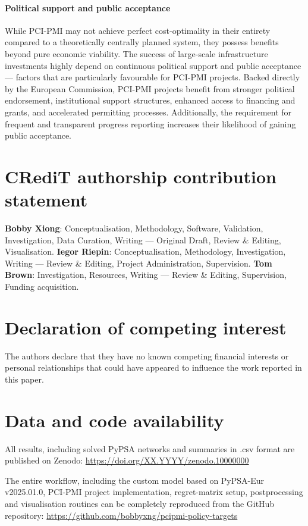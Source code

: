 \documentclass[final,5p,times,twocolumn,sort&compress]{elsarticle}
\begin{document}
\paragraph{Political support and public acceptance} 
While PCI-PMI may not achieve perfect cost-optimality in their entirety compared to a theoretically centrally planned system, they possess benefits beyond pure economic viability. The success of large-scale infrastructure investments highly depend on continuous political support and public acceptance --- factors that are particularly favourable for PCI-PMI projects.
Backed directly by the European Commission, PCI-PMI projects benefit from stronger political endorsement, institutional support structures, enhanced access to financing and grants, and accelerated permitting processes. Additionally, the requirement for frequent and transparent progress reporting increases their likelihood of gaining public acceptance.

\section*{CRediT authorship contribution statement}
\textbf{Bobby Xiong}: Conceptualisation, Methodology, Software, Validation, Investigation, Data Curation, Writing --- Original Draft, Review \& Editing, Visualisation. \textbf{Iegor Riepin}: Conceptualisation, Methodology, Investigation, Writing --- Review \& Editing, Project Administration, Supervision. \textbf{Tom Brown}: Investigation, Resources, Writing --- Review \& Editing, Supervision, Funding acquisition.

\section*{Declaration of competing interest}
The authors declare that they have no known competing financial interests or personal relationships that could have appeared to influence the work reported in this paper.

\section*{Data and code availability}
All results, including solved PyPSA networks and summaries in .csv format are published on Zenodo: \newline
\href{https://doi.org/XX.YYYY/zenodo.10000000}{https://doi.org/XX.YYYY/zenodo.10000000}

The entire workflow, including the custom model based on PyPSA-Eur v2025.01.0, PCI-PMI project implementation, regret-matrix setup, postprocessing and visualisation routines can be completely reproduced from the GitHub repository: \newline 
\href{https://github.com/bobbyxng/pcipmi-policy-targets}{https://github.com/bobbyxng/pcipmi-policy-targets}
\end{document}

